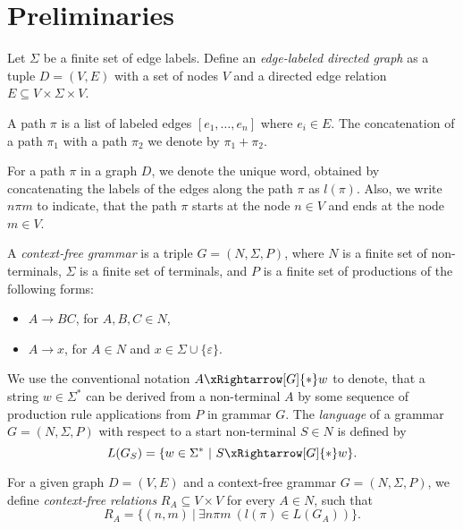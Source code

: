 \section{Preliminaries}
\label{section_preliminaries}

Let $\Sigma$ be a finite set of edge labels. Define an \emph{edge-labeled directed graph} as a tuple \mbox{$D = (V, E)$} with a set of nodes $V$ and a directed edge relation \mbox{$E \subseteq V \times \Sigma \times V$}.

A path $\pi$ is a list of labeled edges $[e_1,\ldots,e_n]$ where $e_i \in E$. The concatenation of a path $\pi_1$ with a path $\pi_2$ we denote by $\pi_1 + \pi_2$.

For a path $\pi$ in a graph $D$, we denote the unique word, obtained by concatenating the labels of the edges along the path $\pi$ as \mbox{$l(\pi)$}. Also, we write \mbox{$n \pi m$} to indicate, that the path $\pi$ starts at the node \mbox{$n \in V$} and ends at the node \mbox{$m \in V$}.

A \emph{context-free grammar} is a triple \mbox{$G = (N, \Sigma, P)$}, where $N$ is a finite set of non-terminals, $\Sigma$ is a finite set of terminals, and $P$ is a finite set of productions of the following forms:

\begin{itemize}
    \item $A \rightarrow B C$, for $A,B,C \in N$,
    \item $A \rightarrow x$, for $A \in N$ and $x \in \Sigma \cup \{\varepsilon\}$.   
\end{itemize}

We use the conventional notation \mbox{$A \xRightarrow[G]{*} w$} to denote, that a string \mbox{$w \in \Sigma^*$} can be derived from a non-terminal $A$ by some sequence of production rule applications from $P$ in grammar $G$. The \emph{language} of a grammar \mbox{$G = (N,\Sigma,P)$} with respect to a start non-terminal \mbox{$S \in N$} is defined by $$L(G_S) = \{w \in \Sigma^*~|~S \xRightarrow[G]{*} w\}.$$

For a given graph \mbox{$D = (V, E)$} and a context-free grammar $G = (N, \Sigma, P)$, we define \emph{context-free relations} \mbox{$R_A \subseteq V \times V$} for every \mbox{$A \in N$}, such that $$R_A = \{(n,m)~|~\exists n \pi m~(l(\pi) \in L(G_A))\}.$$


